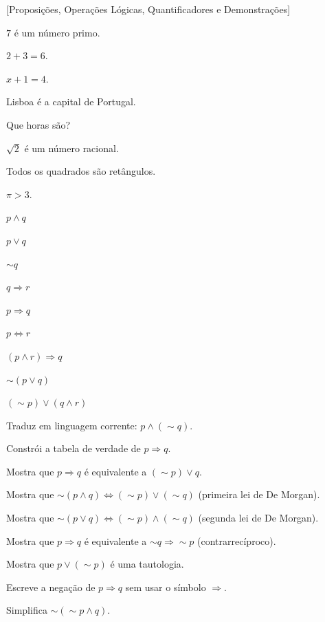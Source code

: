 \documentclass[12pt]{article}
\begin{document}
[Proposições, Operações Lógicas, Quantificadores e Demonstrações]


\begin{exercicios}
  \item $7$ é um número primo.
  \item $2 + 3 = 6$.
  \item $x + 1 = 4$.
  \item Lisboa é a capital de Portugal.
  \item Que horas são?
  \item $\sqrt{2}$ é um número racional.
  \item Todos os quadrados são retângulos.
  \item $\pi > 3$.
\end{exercicios}

\begin{exercicios}
  \item $p \wedge q$
  \item $p \vee q$
  \item $\sim q$
  \item $q \Rightarrow r$
  \item $p \Rightarrow q$
  \item $p \Leftrightarrow r$
  \item $(p \wedge r) \Rightarrow q$
  \item $\sim (p \vee q)$
  \item $(\sim p) \vee (q \wedge r)$
  \item Traduz em linguagem corrente: $p \wedge (\sim q)$.
\end{exercicios}

\begin{exercicios}
  \item Constrói a tabela de verdade de $p \Rightarrow q$.
  \item Mostra que $p \Rightarrow q$ é equivalente a $(\sim p) \vee q$.
  \item Mostra que $\sim (p \wedge q) \Leftrightarrow (\sim p) \vee (\sim q)$ (primeira lei de De Morgan).
  \item Mostra que $\sim (p \vee q) \Leftrightarrow (\sim p) \wedge (\sim q)$ (segunda lei de De Morgan).
  \item Mostra que $p \Rightarrow q$ é equivalente a $\sim q \Rightarrow \sim p$ (contrarrecíproco).
  \item Mostra que $p \vee (\sim p)$ é uma tautologia.
  \item Escreve a negação de $p \Rightarrow q$ sem usar o símbolo $\Rightarrow$.
  \item Simplifica $\sim (\sim p \wedge q)$.
\end{exercicios}
\end{document}
